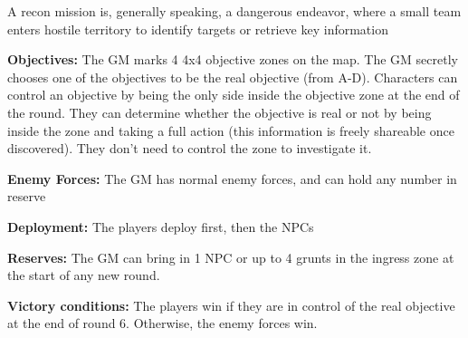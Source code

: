  A recon mission is, generally speaking, a dangerous endeavor, where a small team enters hostile territory to identify targets or retrieve key information

 \textbf{Objectives:} The GM marks 4 4x4 objective zones on the map. The GM secretly chooses one of the objectives to be the real objective (from A-D). Characters can control an objective by being the only side inside the objective zone at the end of the round. They can determine whether the objective is real or not by being inside the zone and taking a full action (this information is freely shareable once discovered). They don't need to control the zone to investigate it.

 \textbf{Enemy Forces:} The GM has normal enemy forces, and can hold any number in reserve

 \textbf{Deployment:} The players deploy first, then the NPCs

 \textbf{Reserves:} The GM can bring in 1 NPC or up to 4 grunts in the ingress zone at the start of any new round.

 \textbf{Victory conditions:} The players win if they are in control of the real objective at the end of round 6. Otherwise, the enemy forces win.
